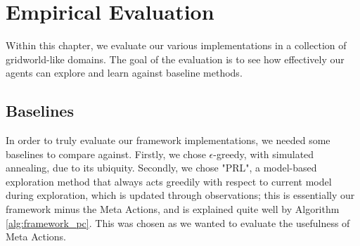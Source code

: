 \chapter{Empirical Evaluation}
\label{chapter4}
Within this chapter, we evaluate our various implementations in a collection of gridworld-like domains. The goal of the evaluation is to see how effectively our agents can explore and learn against baseline methods. 


\section{Baselines}
In order to truly evaluate our framework implementations, we needed some baselines to compare against. Firstly, we chose $\epsilon$-greedy, with simulated annealing, due to its ubiquity. Secondly, we chose "PRL", a model-based exploration method that always acts greedily with respect to current model during exploration, which is updated through observations; this is essentially our framework minus the Meta Actions, and is explained quite well by Algorithm \ref{alg:framework_pc}. 
This was chosen as we wanted to evaluate the usefulness of Meta Actions.


